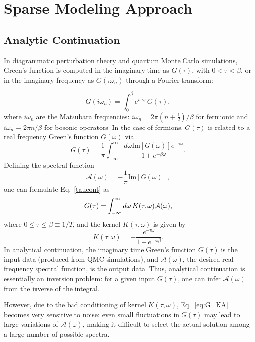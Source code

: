 \documentclass[final,5p,twocolumn,12pt]{elsarticle}
\begin{document}
\section{Sparse Modeling Approach}
\subsection{Analytic Continuation}
In diagrammatic perturbation theory and quantum Monte Carlo simulations, Green's function is computed in the imaginary time as $G(\tau)$, with $0<\tau<\beta$, or in the imaginary frequency as $G(i\omega_n)$ through a Fourier transform:

\begin{equation}
G(i\omega_n)=\int_0^\beta e^{i\omega_n\tau}G(\tau),
\end{equation}
where $i\omega_n$ are the Matsubara frequencies: $i\omega_n = 2\pi(n+\frac{1}{2})/\beta$ for fermionic and $i\omega_n=2\pi n/\beta$ for bosonic operators. In the case of fermions, $G(\tau)$ is related to a real frequency Green's function $G(\omega)$ via
\begin{equation}
G(\tau) = \frac{1}{\pi}\int_{-\infty}^{\infty}  \frac{d\omega \text{Im}\left[G(\omega)\right]e^{-\tau\omega}}{1+e^{-\beta\omega}}. \label{taucont}
\end{equation}
Defining the spectral function
\begin{equation}
\mathcal{A}(\omega)=-\dfrac{1}{\pi}\mbox{Im}\left[G(\omega)\right], 
\end{equation}
one can formulate Eq.~\ref{taucont} as
\begin{equation}
G(\tau)=\int_{-\infty}^{\infty} d\omega\thinspace K(\tau,\omega)\mathcal{A}(\omega),
\label{eq:G=KA}
\end{equation}
where $0\leq\tau\leq\beta\equiv1/T$, and the kernel $K(\tau,\omega)$ is given by 
\begin{equation}
K(\tau,\omega) =-\dfrac{e^{-\tau\omega}}{1+e^{-\omega\beta}}.
\end{equation}
In analytical continuation, the imaginary time Green's function $G(\tau)$ is the input data (produced from QMC simulations), and $\mathcal{A}(\omega)$, the desired real frequency spectral function, is the output data. Thus, analytical continuation is essentially an inversion problem: for a given input $G(\tau)$, one can infer $\mathcal{A}(\omega)$ from the inverse of the integral. 

However, due to the bad conditioning of kernel $K(\tau,\omega)$, Eq.~\ref{eq:G=KA} becomes very sensitive to noise: even small fluctuations in $G(\tau)$ may lead to large variations of $\mathcal{A}(\omega)$, making it difficult to select the actual solution among a large number of possible spectra. 
\end{document}
